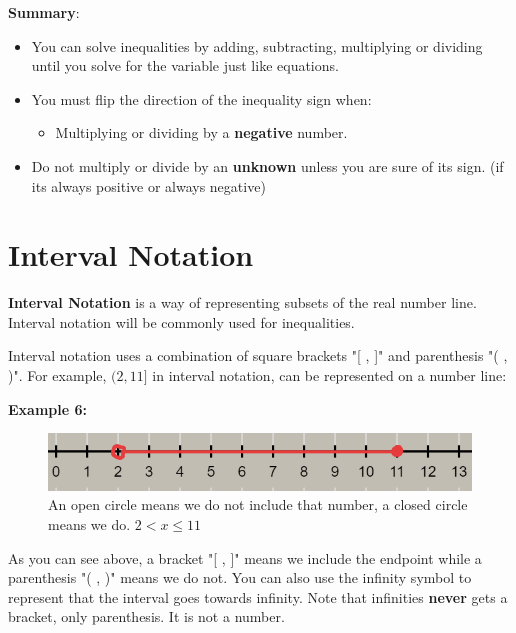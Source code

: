 \documentclass[12pt,fleqn]{book} %
\begin{document}
\noindent\textbf{Summary}:
\begin{itemize}
    \item You can solve inequalities by adding, subtracting, multiplying or dividing until you solve for the variable just like equations.
    \item You must flip the direction of the inequality sign when:
    \begin{itemize}
        \item Multiplying or dividing by a \textbf{negative} number.
    \end{itemize}
    \item Do not multiply or divide by an \textbf{unknown} unless you are sure of its sign. (if its always positive or always negative)
\end{itemize}
\vspace*{-6mm}
\section{Interval Notation}

\vspace*{-2mm}

\textbf{Interval Notation} is a way of representing subsets of the real number line. Interval notation will be commonly used for inequalities.\\

\vspace*{-3mm}

\noindent Interval notation uses a combination of square brackets "[ , ]" and parenthesis "( , )". For example, $(2,11]$ in interval notation, can be represented on a number line:

\noindent \textbf{Example 6:}

\begin{figure}[h]
\centering\includegraphics[scale=0.5]{Pictures/Example1.PNG}
\caption{\footnotesize{An open circle means we do not include that number, a closed circle means we do. $2<x\leq11$}}
\end{figure}

\vspace*{-3mm}

\noindent As you can see above, a bracket "[ , ]" means we include the endpoint while a parenthesis "( , )" means we do not. You can also use the infinity symbol to represent that the interval goes towards infinity. Note that infinities \textbf{never} gets a bracket, only parenthesis. It is not a number.
\end{document}
